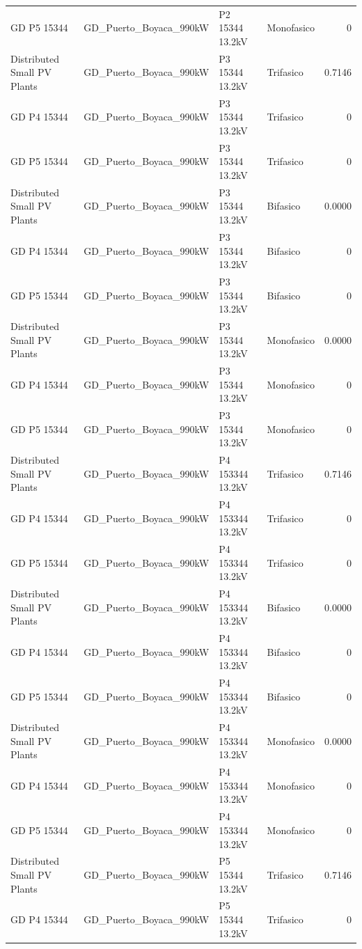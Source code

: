 \documentclass[11pt,a4paper]{article}
\begin{document}
\begin{longtable}{llllr}
GD P5 15344 & GD\_Puerto\_Boyaca\_990kW & P2 15344 13.2kV & Monofasico & 0 \\
Distributed Small PV Plants & GD\_Puerto\_Boyaca\_990kW & P3 15344 13.2kV & Trifasico & 0.7146 \\
GD P4 15344 & GD\_Puerto\_Boyaca\_990kW & P3 15344 13.2kV & Trifasico & 0 \\
GD P5 15344 & GD\_Puerto\_Boyaca\_990kW & P3 15344 13.2kV & Trifasico & 0 \\
Distributed Small PV Plants & GD\_Puerto\_Boyaca\_990kW & P3 15344 13.2kV & Bifasico & 0.0000 \\
GD P4 15344 & GD\_Puerto\_Boyaca\_990kW & P3 15344 13.2kV & Bifasico & 0 \\
GD P5 15344 & GD\_Puerto\_Boyaca\_990kW & P3 15344 13.2kV & Bifasico & 0 \\
Distributed Small PV Plants & GD\_Puerto\_Boyaca\_990kW & P3 15344 13.2kV & Monofasico & 0.0000 \\
GD P4 15344 & GD\_Puerto\_Boyaca\_990kW & P3 15344 13.2kV & Monofasico & 0 \\
GD P5 15344 & GD\_Puerto\_Boyaca\_990kW & P3 15344 13.2kV & Monofasico & 0 \\
Distributed Small PV Plants & GD\_Puerto\_Boyaca\_990kW & P4 153344 13.2kV & Trifasico & 0.7146 \\
GD P4 15344 & GD\_Puerto\_Boyaca\_990kW & P4 153344 13.2kV & Trifasico & 0 \\
GD P5 15344 & GD\_Puerto\_Boyaca\_990kW & P4 153344 13.2kV & Trifasico & 0 \\
Distributed Small PV Plants & GD\_Puerto\_Boyaca\_990kW & P4 153344 13.2kV & Bifasico & 0.0000 \\
GD P4 15344 & GD\_Puerto\_Boyaca\_990kW & P4 153344 13.2kV & Bifasico & 0 \\
GD P5 15344 & GD\_Puerto\_Boyaca\_990kW & P4 153344 13.2kV & Bifasico & 0 \\
Distributed Small PV Plants & GD\_Puerto\_Boyaca\_990kW & P4 153344 13.2kV & Monofasico & 0.0000 \\
GD P4 15344 & GD\_Puerto\_Boyaca\_990kW & P4 153344 13.2kV & Monofasico & 0 \\
GD P5 15344 & GD\_Puerto\_Boyaca\_990kW & P4 153344 13.2kV & Monofasico & 0 \\
Distributed Small PV Plants & GD\_Puerto\_Boyaca\_990kW & P5 15344 13.2kV & Trifasico & 0.7146 \\
GD P4 15344 & GD\_Puerto\_Boyaca\_990kW & P5 15344 13.2kV & Trifasico & 0 \\

\end{longtable}
\end{document}

